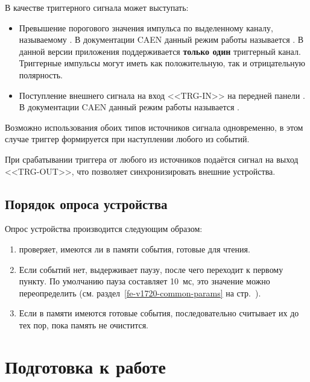 В качестве триггерного сигнала может выступать:

\begin{itemize}

\item Превышение порогового значения импульса  по выделенному каналу, называемому . В документации CAEN данный режим работы называется   \cite{CaenUM3051ST}. В данной версии приложения поддерживается {\bf только один} триггерный канал. Триггерные импульсы могут иметь как положительную, так и отрицательную полярность.

\item Поступление внешнего сигнала на вход <<TRG-IN>> на передней панели \DEVICE{}. В документации CAEN данный режим работы называется  \cite{CaenUM3051ET}.

\end{itemize}

Возможно использования обоих типов источников сигнала одновременно, в этом случае триггер формируется при наступлении любого из событий.

При срабатывании триггера от любого из источников подаётся сигнал на выход <<TRG-OUT>>, что позволяет синхронизировать внешние устройства.

\subsection{Порядок опроса устройства}

Опрос устройства производится следующим образом:

\begin{enumerate}

\item 
\label{item-fe-v1720-poll-check}
\FE{} проверяет, имеются ли в памяти \DEVICE{} события, готовые для чтения.

\item Если событий нет, \FE{} выдерживает паузу, после чего переходит к первому пункту. По умолчанию пауза составляет 10~мс, это значение можно переопределить (см. раздел~\ref{fe-v1720-common-params} на стр.~\pageref{fe-v1720-common-params}).

\item Если в памяти \DEVICE{} имеются готовые события, \FE{} последовательно считывает их до тех пор, пока память не очистится.

\end{enumerate}

\section{Подготовка к работе}

